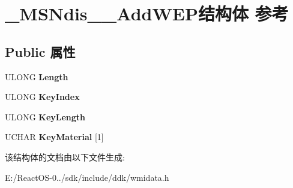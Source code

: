 \hypertarget{struct___m_s_ndis__80211___add_w_e_p}{}\section{\+\_\+\+M\+S\+Ndis\+\_\+\_\+\+Add\+W\+E\+P结构体 参考}
\label{struct___m_s_ndis__80211___add_w_e_p}
\subsection*{Public 属性}
\begin{DoxyCompactItemize}
\item 
\mbox{\label{struct___m_s_ndis__80211___add_w_e_p_af73de7fed8c8a4315dae55efb9e2eaa2}} 
U\+L\+O\+NG {\bfseries Length}
\item 
\mbox{\label{struct___m_s_ndis__80211___add_w_e_p_a0175da0b1137f4676e93e708c6132251}} 
U\+L\+O\+NG {\bfseries Key\+Index}
\item 
\mbox{\label{struct___m_s_ndis__80211___add_w_e_p_ab7a6e2e4b1431b0b2bcc64464c96571c}} 
U\+L\+O\+NG {\bfseries Key\+Length}
\item 
\mbox{\label{struct___m_s_ndis__80211___add_w_e_p_abcb9546338e7900c730e5ff722f0cf67}} 
U\+C\+H\+AR {\bfseries Key\+Material} \mbox{[}1\mbox{]}
\end{DoxyCompactItemize}


该结构体的文档由以下文件生成\+:\begin{DoxyCompactItemize}
\item 
E\+:/\+React\+O\+S-\/0../sdk/include/ddk/wmidata.\+h\end{DoxyCompactItemize}
